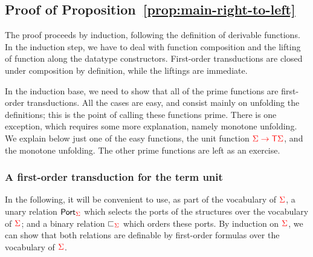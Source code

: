 \subsection{Proof of Proposition~\ref{prop:main-right-to-left}}
The proof proceeds by induction, following the definition of derivable functions. 
In the induction step, we have to deal with function composition and the lifting of function along the datatype constructors. First-order transductions are closed under composition by definition, while the liftings are immediate. 

In the induction base, we need to show that all of the prime functions are first-order transductions. 
All the cases are easy, and consist mainly on unfolding the definitions; this is the point of calling these functions prime. There is one exception, which requires some more explanation, namely monotone unfolding. We explain below just one of the easy functions, the unit function ${\color{red}{\Sigma \to {\color{red}{\mathsf T}}\Sigma}}$, and the monotone unfolding. The other prime functions are left as an exercise. 
    
\subsubsection{A first-order transduction for the term unit}
\label{sec:transduction-unit}
    In the following, it will be convenient to use, as part of the vocabulary of ${\color{red}{\Sigma}}$, a unary relation  $\mathsf{Port}_{\color{red}{\Sigma}}$ which selects the ports of the structures over the vocabulary of ${\color{red}{\Sigma}}$; and a binary relation $\sqsubset_{\color{red}{\Sigma}}$ which orders these ports. By induction on ${\color{red}{\Sigma}}$, we can show that both relations are definable by first-order formulas over  the vocabulary of ${\color{red}{\Sigma}}$.
    
